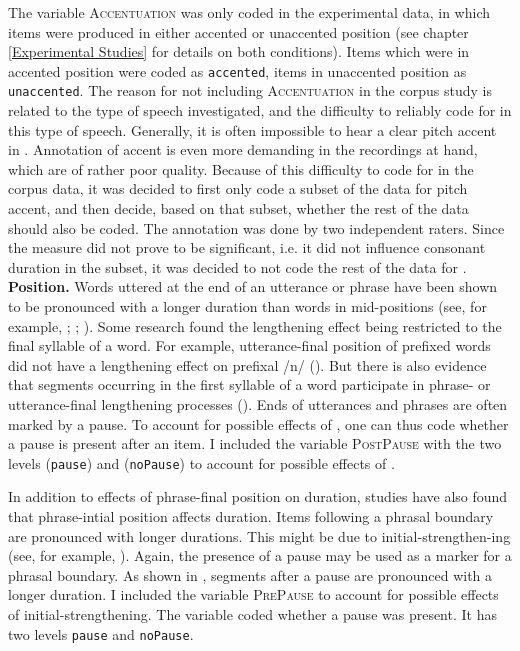 The variable \textsc{Accentuation} was only coded in the experimental data, in which items were produced in either accented or unaccented position (see chapter \ref{Experimental Studies} for details on both conditions). Items which were in accented position were coded as \texttt{accented}, items in unaccented position as \texttt{unaccented}. 
The reason for not including \textsc{Accentuation} in the corpus study is related to the type of speech investigated, and the difficulty to reliably code for  in this type of speech. Generally, it is often impossible to hear a clear pitch accent in . 
Annotation of accent is even more demanding in the recordings at hand, which are of rather poor quality. Because of this difficulty to code for  in the corpus data, it was decided to first only code a subset of the data for pitch accent, and then decide, based on that subset, whether the rest of the data should also be coded. The annotation was done by two independent raters. Since the measure did not prove to be significant, i.e. it did not influence consonant duration in the subset, it was decided to not code the rest of the data for .\\  


\textbf{Position.} Words uttered at the end of an utterance or phrase have been shown to be pronounced with a longer duration than words in mid-positions (see, for example,  \citealt{Berkovits.1993}; \citealt{Hay.2007}; \citealt{Oller.1973}). Some research found the lengthening effect being restricted to the final syllable of a word. For example, utterance-final position of prefixed words did not have a lengthening effect on prefixal /n/ (\citealt{Hay.2007}). But there is also evidence that segments occurring in the first syllable of a word participate in phrase- or utterance-final lengthening processes (\citealt{Oller.1973}). Ends of utterances and phrases are often marked by a pause. To account for possible effects of , one can thus code whether a pause is present after an item. I included the variable \textsc{PostPause} with the two levels (\texttt{pause}) and (\texttt{noPause}) to account for possible effects of . 

In addition to effects of phrase-final position on duration, studies have also found that phrase-intial position affects duration. Items following a phrasal boundary are pronounced with longer durations. This might be due to initial-strengthen-ing (see, for example, \citealt{Cho.2001b,Byrd.2006,Cho.2007}). Again, the presence of a pause may be used as a marker for a phrasal boundary. As shown in \cite{Umeda.1977}, segments after a pause are pronounced with a longer duration. 
I included the variable \textsc{PrePause} to account for possible effects of initial-strengthening. The variable coded whether a pause was present. It has two levels \texttt{pause} and \texttt{noPause}. 

